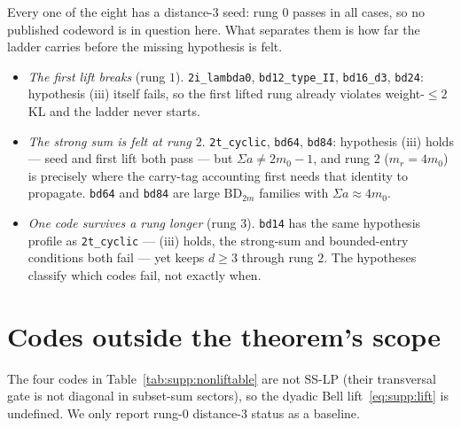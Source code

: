 \documentclass[11pt]{article}
\begin{document}
Every one of the eight has a distance-3 seed: rung $0$ passes in all cases, so
no published codeword is in question here. What separates them is how far the
ladder carries before the missing hypothesis is felt.

\begin{itemize}[leftmargin=2em]
\item \emph{The first lift breaks} (rung $1$). \texttt{2i\_lambda0},
\texttt{bd12\_type\_II}, \texttt{bd16\_d3}, \texttt{bd24}: hypothesis (iii)
itself fails, so the first lifted rung already violates weight-$\le2$ KL and
the ladder never starts.
\item \emph{The strong sum is felt at rung $2$}. \texttt{2t\_cyclic},
\texttt{bd64}, \texttt{bd84}: hypothesis (iii) holds --- seed and first lift
both pass --- but $\Sigma a \ne 2m_0-1$, and rung $2$ ($m_r = 4m_0$) is
precisely where the carry-tag accounting first needs that identity to
propagate. \texttt{bd64} and \texttt{bd84} are large $\mathrm{BD}_{2m}$
families with $\Sigma a \approx 4m_0$.
\item \emph{One code survives a rung longer} (rung $3$). \texttt{bd14} has the
same hypothesis profile as \texttt{2t\_cyclic} --- (iii) holds, the strong-sum
and bounded-entry conditions both fail --- yet keeps $d\ge3$ through rung $2$.
The hypotheses classify which codes fail, not exactly when.
\end{itemize}

\section{Codes outside the theorem's scope}
\label{sec:supp:nonliftable}

The four codes in Table~\ref{tab:supp:nonliftable} are not SS-LP (their
transversal gate is not diagonal in subset-sum sectors), so the dyadic Bell
lift~\eqref{eq:supp:lift} is undefined. We only report rung-$0$ distance-3
status as a baseline.
\end{document}
